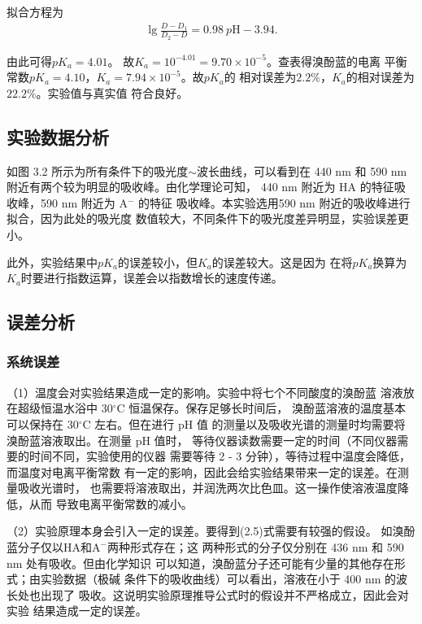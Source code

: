 \documentclass[12pt]{ctexart}
\numberwithin{equation}{section}
\begin{document}
拟合方程为
\begin{align}
    \lg\frac{D-D_1}{D_2-D}
        = 0.98 ~ p\mathrm{H} - 3.94.
\end{align}

由此可得$pK_a = 4.01$。
故$K_a = 10^{-4.01} = 9.70 \times 10^{-5}$。查表得溴酚蓝的电离
平衡常数$pK_a = 4.10$，$K_a = 7.94 \times 10^{-5}$。故$pK_a$的
相对误差为$2.2\%$，$K_a$的相对误差为$22.2\%$。实验值与真实值
符合良好。

\subsection{实验数据分析}

如图 3.2 所示为所有条件下的吸光度$\sim$波长曲线，可以看到在
440 nm 和 590 nm 附近有两个较为明显的吸收峰。由化学理论可知，
440 nm 附近为 HA 的特征吸收峰，590 nm 附近为 A$^-$ 的特征
吸收峰。本实验选用590 nm 附近的吸收峰进行拟合，因为此处的吸光度
数值较大，不同条件下的吸光度差异明显，实验误差更小。

此外，实验结果中$pK_a$的误差较小，但$K_a$的误差较大。这是因为
在将$pK_a$换算为$K_a$时要进行指数运算，误差会以指数增长的速度传递。

\subsection{误差分析}

\subsubsection{系统误差}

（1）温度会对实验结果造成一定的影响。实验中将七个不同酸度的溴酚蓝
溶液放在超级恒温水浴中 30$^\circ$C 恒温保存。保存足够长时间后，
溴酚蓝溶液的温度基本可以保持在 30$^\circ$C 左右。但在进行 pH 值
的测量以及吸收光谱的测量时均需要将溴酚蓝溶液取出。在测量 pH 值时，
等待仪器读数需要一定的时间（不同仪器需要的时间不同，实验使用的仪器
需要等待 2 - 3 分钟），等待过程中温度会降低，而温度对电离平衡常数
有一定的影响，因此会给实验结果带来一定的误差。在测量吸收光谱时，
也需要将溶液取出，并润洗两次比色皿。这一操作使溶液温度降低，从而
导致电离平衡常数的减小。

（2）实验原理本身会引入一定的误差。要得到(2.5)式需要有较强的假设。
如溴酚蓝分子仅以$\mathrm{HA}$和$\mathrm{A^-}$两种形式存在；这
两种形式的分子仅分别在 436 nm 和 590 nm 处有吸收。但由化学知识
可以知道，溴酚蓝分子还可能有少量的其他存在形式；由实验数据（极碱
条件下的吸收曲线）可以看出，溶液在小于 400 nm 的波长处也出现了
吸收。这说明实验原理推导公式时的假设并不严格成立，因此会对实验
结果造成一定的误差。
\end{document}
